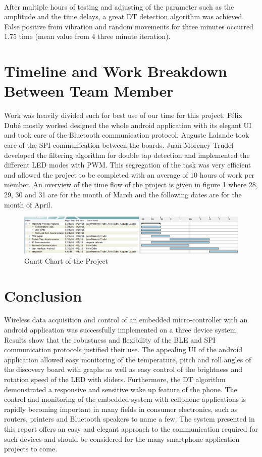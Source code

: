 \documentclass[12pt]{article}
\begin{document}
\paragraph{}
After multiple hours of testing and adjusting of the parameter such as the amplitude and the time delays, a great DT detection algorithm was achieved. False positive from vibration and random movements for three minutes occurred 1.75 time (mean value from 4 three minute iteration).

\section{Timeline and Work Breakdown Between Team Member}
Work was heavily divided such for best use of our time for this project. Félix Dubé mostly worked designed the whole android application with its elegant UI and took care of the Bluetooth communication protocol. Auguste Lalande took care of the SPI communication between the boards. Juan Morency Trudel developed the filtering algorithm for double tap detection and implemented the different LED modes with PWM. This segregation of the task was very efficient and allowed the project to be completed with an average of 10 hours of work per member. An overview of the time flow of the project is given in figure \ref{fig:Gantt} where 28, 29, 30 and 31 are for the month of March and the following dates are for the month of April.
\begin{figure}[!htb]
 \centering
 \includegraphics[scale=0.38]{images/gantt.png}
 \caption{Gantt Chart of the Project}
 \label{fig:Gantt}
\end{figure}
\section{Conclusion}
Wireless data acquisition and control of an embedded micro-controller with an android application was successfully implemented on a three device system. Results show that the robustness and flexibility of the BLE and SPI communication protocols justified their use. The appealing UI of the android application allowed easy monitoring of the temperature, pitch and roll angles of the discovery board with graphs as well as easy control of the brightness and rotation speed of the LED with sliders. Furthermore, the DT algorithm demonstrated a responsive and sensitive wake up feature of the phone. The control and monitoring of the embedded system with cellphone applications is rapidly becoming important in many fields in consumer electronics, such as routers, printers and Bluetooth speakers to name a few. The system presented in this report offers an easy and elegant approach to the communication required for such devices and should be considered for the many smartphone application projects to come.
\end{document}
